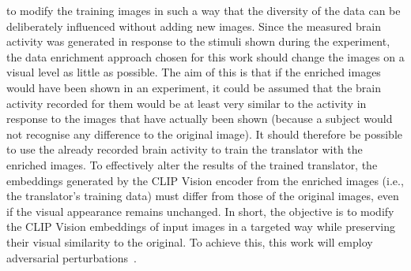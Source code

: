  to modify the training images in such a way that the diversity of the data can be deliberately influenced without adding new images. Since the measured brain activity was generated in response to the stimuli shown during the experiment, the data enrichment approach chosen for this work should change the images on a visual level as little as possible. The aim of this is that if the enriched images would have been shown in an experiment, it could be assumed that the brain activity recorded for them would be at least very similar to the activity in response to the images that have actually been shown (because a subject would not recognise any difference to the original image). It should therefore be possible to use the already recorded brain activity to train the translator with the enriched images. To effectively alter the results of the trained translator, the embeddings generated by the CLIP Vision encoder from the enriched images (i.e., the translator's training data) must differ from those of the original images, even if the visual appearance remains unchanged. In short, the objective is to modify the CLIP Vision embeddings of input images in a targeted way while preserving their visual similarity to the original. To achieve this, this work will employ adversarial perturbations~\cite{goodfellowExplainingHarnessingAdversarial2014, papernotPracticalBlackBoxAttacks2017, naseerIntriguingPropertiesVision2021}.


